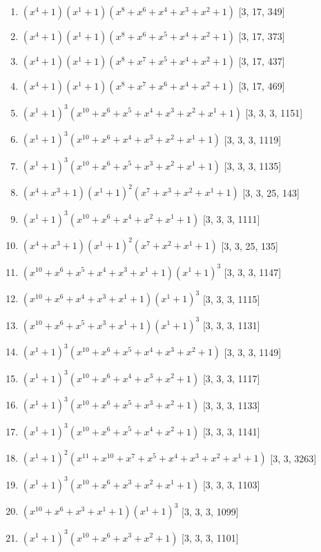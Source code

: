 \documentclass[10pt,twocolumn]{article}
\begin{document}
\begin{enumerate}
\item $(x^{4} + 1)(x^{1} + 1)(x^{8} + x^{6} + x^{4} + x^{3} + x^{2} + 1)$  [3, 17, 349]
\item $(x^{4} + 1)(x^{1} + 1)(x^{8} + x^{6} + x^{5} + x^{4} + x^{2} + 1)$  [3, 17, 373]
\item $(x^{4} + 1)(x^{1} + 1)(x^{8} + x^{7} + x^{5} + x^{4} + x^{2} + 1)$  [3, 17, 437]
\item $(x^{4} + 1)(x^{1} + 1)(x^{8} + x^{7} + x^{6} + x^{4} + x^{2} + 1)$  [3, 17, 469]
\item $(x^{1} + 1)^{3}(x^{10} + x^{6} + x^{5} + x^{4} + x^{3} + x^{2} + x^{1} + 1)$  [3, 3, 3, 1151]
\item $(x^{1} + 1)^{3}(x^{10} + x^{6} + x^{4} + x^{3} + x^{2} + x^{1} + 1)$  [3, 3, 3, 1119]
\item $(x^{1} + 1)^{3}(x^{10} + x^{6} + x^{5} + x^{3} + x^{2} + x^{1} + 1)$  [3, 3, 3, 1135]
\item $(x^{4} + x^{3} + 1)(x^{1} + 1)^{2}(x^{7} + x^{3} + x^{2} + x^{1} + 1)$  [3, 3, 25, 143]
\item $(x^{1} + 1)^{3}(x^{10} + x^{6} + x^{4} + x^{2} + x^{1} + 1)$  [3, 3, 3, 1111]
\item $(x^{4} + x^{3} + 1)(x^{1} + 1)^{2}(x^{7} + x^{2} + x^{1} + 1)$  [3, 3, 25, 135]
\item $(x^{10} + x^{6} + x^{5} + x^{4} + x^{3} + x^{1} + 1)(x^{1} + 1)^{3}$  [3, 3, 3, 1147]
\item $(x^{10} + x^{6} + x^{4} + x^{3} + x^{1} + 1)(x^{1} + 1)^{3}$  [3, 3, 3, 1115]
\item $(x^{10} + x^{6} + x^{5} + x^{3} + x^{1} + 1)(x^{1} + 1)^{3}$  [3, 3, 3, 1131]
\item $(x^{1} + 1)^{3}(x^{10} + x^{6} + x^{5} + x^{4} + x^{3} + x^{2} + 1)$  [3, 3, 3, 1149]
\item $(x^{1} + 1)^{3}(x^{10} + x^{6} + x^{4} + x^{3} + x^{2} + 1)$  [3, 3, 3, 1117]
\item $(x^{1} + 1)^{3}(x^{10} + x^{6} + x^{5} + x^{3} + x^{2} + 1)$  [3, 3, 3, 1133]
\item $(x^{1} + 1)^{3}(x^{10} + x^{6} + x^{5} + x^{4} + x^{2} + 1)$  [3, 3, 3, 1141]
\item $(x^{1} + 1)^{2}(x^{11} + x^{10} + x^{7} + x^{5} + x^{4} + x^{3} + x^{2} + x^{1} + 1)$  [3, 3, 3263]
\item $(x^{1} + 1)^{3}(x^{10} + x^{6} + x^{3} + x^{2} + x^{1} + 1)$  [3, 3, 3, 1103]
\item $(x^{10} + x^{6} + x^{3} + x^{1} + 1)(x^{1} + 1)^{3}$  [3, 3, 3, 1099]
\item $(x^{1} + 1)^{3}(x^{10} + x^{6} + x^{3} + x^{2} + 1)$  [3, 3, 3, 1101]

\end{enumerate}
\end{document}
